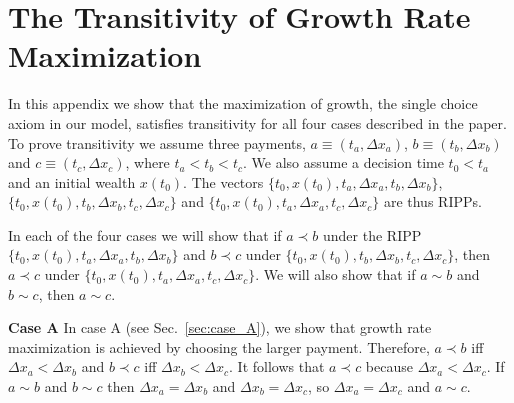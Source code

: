 \documentclass[11pt]{article}
\newtheorem{proposition}{Proposition}
\newcommand{\sref}[1]{Sec.~\ref{sec:#1}}
\newcommand{\Aref}[1]{Axiom~\ref{ax:#1}}
\newcommand{\Dx}{\Delta x}
\newcommand{\subhead}[1]{\mbox{}\newline\textbf{#1}\newline}
\numberwithin{equation}{section}
\begin{document}
%



\clearpage
\appendix

\section{The Transitivity of Growth Rate Maximization}\label{app:appA}

In this appendix we show that the maximization of growth, the single choice axiom in our model, satisfies transitivity for all four cases described in the paper. To prove transitivity we assume three payments, $a\equiv\left(t_a,\Dx_a\right)$, $b\equiv\left(t_b,\Dx_b\right)$ and $c\equiv\left(t_c,\Dx_c\right)$, where $t_a < t_b < t_c$. We also assume a decision time $t_0 < t_a$ and an initial wealth $x\left(t_0\right)$. The vectors $\{t_0,x\left(t_0\right),t_a,\Dx_a,t_b,\Dx_b\}$, $\{t_0,x\left(t_0\right),t_b,\Dx_b,t_c,\Dx_c\}$ and $\{t_0,x\left(t_0\right),t_a,\Dx_a,t_c,\Dx_c\}$ are thus RIPPs.

In each of the four cases we will show that if $a \prec b$ under the RIPP $\{t_0,x\left(t_0\right),t_a,\Dx_a,t_b,\Dx_b\}$ and $b \prec c$ under $\{t_0,x\left(t_0\right),t_b,\Dx_b,t_c,\Dx_c\}$, then $a \prec c$ under $\{t_0,x\left(t_0\right),t_a,\Dx_a,t_c,\Dx_c\}$. We will also show that if $a \sim b$ and $b \sim c$, then $a \sim c$.

\subhead{Case A}
In case A (see \sref{case_A}), we show that growth rate maximization is achieved by choosing the larger payment. Therefore, $a \prec b$ iff $\Dx_a < \Dx_b$ and $b \prec c$ iff $\Dx_b < \Dx_c$. It follows that $a \prec c$ because $\Dx_a < \Dx_c$. If $a \sim b$ and $b \sim c$ then $\Dx_a = \Dx_b$ and $\Dx_b = \Dx_c$, so $\Dx_a = \Dx_c$ and $a \sim c$.
\end{document}
